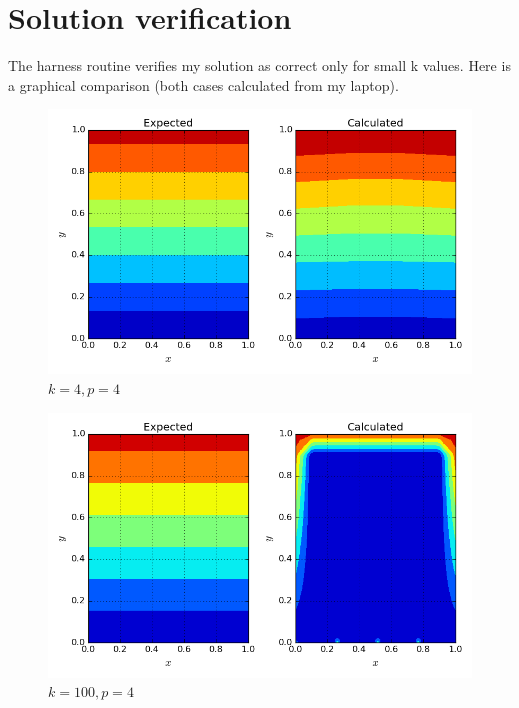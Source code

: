 \documentclass[12pt,letterpaper]{article}
\begin{document}
\section*{Solution verification}
\noindent The harness routine verifies my solution as correct only for small k values. Here is a graphical comparison (both cases calculated from my laptop).
%
\begin{figure}[h]
\centering
\includegraphics[scale = 0.45]{verify_k4.png}
\caption{$k = 4, p = 4$}
\end{figure}
%
\begin{figure}
\centering
\includegraphics[scale = 0.45]{verify_k100.png}
\caption{$k = 100, p = 4$}
\end{figure}
\end{document}
